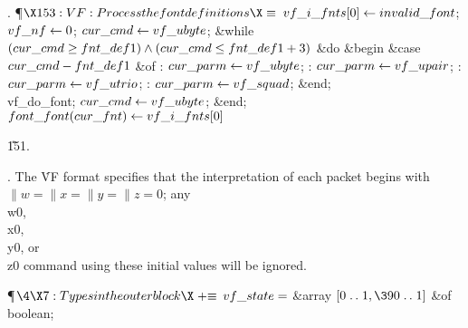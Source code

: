 . \P$\X153:VF: Process the font definitions\X\S$\6
$\\{vf\_i\_fnts}[0]\gets\\{invalid\_font}$;\5
$\\{vf\_nf}\gets0$;\6
$\\{cur\_cmd}\gets\\{vf\_ubyte}$;\6
\&{while} $(\\{cur\_cmd}\ge\\{fnt\_def1})\land(\\{cur\_cmd}\le\\{fnt\_def1}+3)$ \1%
\&{do}\6
\&{begin} \&{case} $\\{cur\_cmd}-\\{fnt\_def1}$ \1\&{of}\6
: $\\{cur\_parm}\gets\\{vf\_ubyte}$;\6
: $\\{cur\_parm}\gets\\{vf\_upair}$;\6
: $\\{cur\_parm}\gets\\{vf\_utrio}$;\6
: $\\{cur\_parm}\gets\\{vf\_squad}$;\2\6
\&{end};\6
\\{vf\_do\_font};\5
$\\{cur\_cmd}\gets\\{vf\_ubyte}$;\6
\&{end};\2\6
$\\{font\_font}(\\{cur\_fnt})\gets\\{vf\_i\_fnts}[0]$\par
\U151.\fi

. The \.{VF} format specifies that the interpretation of each packet
begins with $\|w=\|x=\|y=\|z=0$; any \\{w0}, \\{x0}, \\{y0}, or \\{z0} command
using
these initial values will be ignored.

\Y\P$\4\X7:Types in the outer block\X\mathrel{+}\S$\6
$\\{vf\_state}=$\1\5
\&{array} $[0\to1,\390\to1]$ \1\&{of}\5
\\{boolean};\2\2\par
\fi

